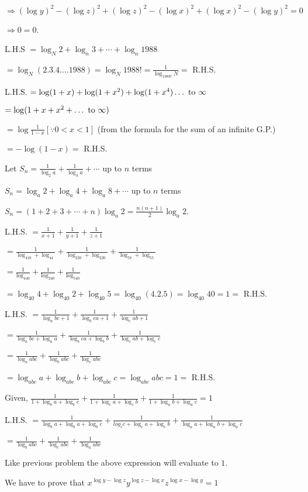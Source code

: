   $\Rightarrow (\log y)^2 - (\log z)^2 + (\log z)^2 - (\log x)^2 + (\log x)^2 - (\log y)^2 = 0$

  $\Rightarrow 0 = 0$.
\item L.H.S $= \log_N2 + \log_n3 + \cdots + \log_n1988$

  $= \log_N(2.3.4.\ldots1988) = \log_N1988! = \frac{1}{\log_{1988!}N} =$ R.H.S.
\item L.H.S. $= \log(1 + x) + \log(1 + x^2) + \log(1 + x^4)\ldots~{\rm to}~\infty$

  $= \log(1 + x + x^2 + \ldots~{\rm to}~\infty)$

  $= \log\frac{1}{1 - x}[\because 0 < x < 1]$ (from the formula for the sum of an infinite G.P.)

  $= -\log(1 - x) =$ R.H.S.
\item Let $S_n = \frac{1}{\log_2a} + \frac{1}{\log_4a} + \cdots$ up to $n$ terms

  $S_n = \log_a2 + \log_a4 + \log_a8 + \cdots$ up to $n$ terms

  $S_n = (1 + 2 + 3 + \cdots + n)\log_a2 = \frac{n(n + 1)}{2}\log_a2$.
\item L.H.S. $= \frac{1}{x + 1} + \frac{1}{y + 1} + \frac{1}{z + 1}$

  $= \frac{1}{\log_410 + \log_44} + \frac{1}{\log_220 + \log_220} + \frac{1}{\log_58 + \log_55}$

  $= \frac{1}{\log_440} + \frac{1}{\log_240} + \frac{1}{\log_540}$

  $= \log_{40}4 + \log_{40}2 + \log_{40}5 = \log_{40}(4.2.5) = \log_{40}40 = 1 =$ R.H.S.
\item L.H.S. $= \frac{1}{\log_abc + 1} + \frac{1}{\log_bca + 1} + \frac{1}{\log_cab + 1}$

  $= \frac{1}{\log_abc + \log_aa} + \frac{1}{\log_bca + \log_bb} + \frac{1}{\log_cab + \log_cc}$

  $= \frac{1}{\log_aabc} + \frac{1}{\log_babc} + \frac{1}{\log_cabc}$

  $= \log_{abc}a + \log_{abc}b + \log_{abc}c = \log_{abc}abc = 1 =$ R.H.S.
\item Given, $\frac{1}{1 + \log_ba + \log_bc} + \frac{1}{1 + \log_ca + \log_cb} + \frac{1}{1 + \log_ab + \log_ac} = 1$

  L.H.S. $= \frac{1}{\log_ba + \log_ba + \log_bc} + \frac{1}{log_cc + \log_ca + \log_cb} + \frac{1}{\log_aa + \log_ab + \log_ac}$

  $= \frac{1}{\log_babc} + \frac{1}{\log_cabc} + \frac{1}{\log_aabc}$

  Like previous problem the above expression will evaluate to $1$.
\item We have to prove that $x^{\log y - \log z}y^{\log z - \log x}z^{\log x - \log y} = 1$

